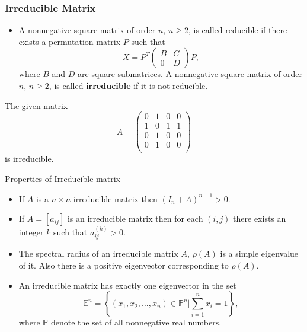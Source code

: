 \documentclass[10pt]{beamer}
\begin{document}
\begin{frame}\frametitle{Irreducible Matrix}
\small
    \justifying
    \begin{itemize}
        \item A nonnegative square matrix of order $n$, $n\geq 2$, is called reducible if there exists a permutation matrix $P$ such that $$X=P^T\begin{pmatrix}
			B & C \\
			0 & D
		\end{pmatrix}P,$$ where $B$ and $D$ are square submatrices. A nonnegative square matrix of order $n$, $n\geq2$, is called \textbf{irreducible} if it is not reducible.
    \end{itemize}
        
		
		\begin{example}
			The given matrix $$A=\begin{pmatrix}
			    0 & 1 & 0 & 0 \\
                    1 & 0 & 1 & 1 \\
                    0 & 1 & 0 & 0 \\
                    0 & 1 & 0 & 0 \\
			\end{pmatrix}$$
            is irreducible.
		\end{example}
\end{frame}
\begin{frame}{Properties of Irreducible matrix}
\small
    \justifying
    \begin{itemize}
        \item If $A$ is a $n\times n$ irreducible matrix then $(I_n+A)^{n-1}>0$.
        
        \item If $A=[a_{ij}]$ is an irreducible matrix then for each $(i,j)$ there exists an integer $k$ such that $a_{ij}^{(k)}>0$.
        
        \item The spectral radius of an irreducible matrix $A$, $\rho(A)$ is a simple eigenvalue of it. Also there is a positive eigenvector corresponding to $\rho(A)$.
        
        \item An irreducible matrix has exactly one eigenvector in the set $$\mathbb{E}^n=\left\{(x_1,x_2,\ldots,x_n)\in\mathbb{P}^n\bigg|\sum_{i=1}^{n}{x_i}=1\right\},$$where $\mathbb{P}$ denote the set of all nonnegative real numbers. 
\end{itemize}
\end{frame}
\end{document}
